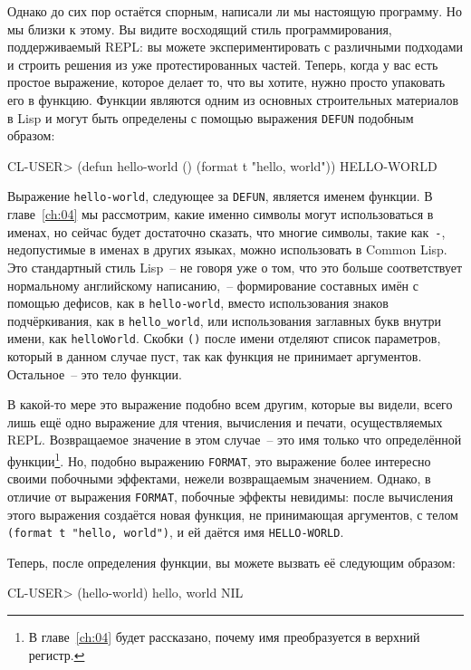 Однако до сих пор остаётся спорным, написали ли мы настоящую программу. Но мы близки к этому.
Вы видите восходящий стиль программирования, поддерживаемый REPL: вы можете
экспериментировать с различными подходами и строить решения из уже протестированных
частей. Теперь, когда у вас есть простое выражение, которое делает то, что вы хотите,
нужно просто упаковать его в функцию. Функции являются одним из основных строительных
материалов в Lisp и могут быть определены с помощью выражения \lstinline{DEFUN} подобным образом:

\begin{myverb}
CL-USER> (defun hello-world () (format t "hello, world"))
HELLO-WORLD
\end{myverb}

Выражение \lstinline{hello-world}, следующее за \lstinline{DEFUN}, является именем функции. В главе~\ref{ch:04} мы
рассмотрим, какие именно символы могут использоваться в именах, но сейчас будет достаточно
сказать, что многие символы, такие как~\lstinline|-|, недопустимые в именах в других
языках, можно использовать в Common Lisp. Это стандартный стиль Lisp~-- не говоря уже о том,
что это больше соответствует нормальному английскому написанию,~-- формирование составных имён с помощью дефисов,
как в \lstinline{hello-world}, вместо использования знаков подчёркивания, как в \lstinline|hello_world|, или
использования заглавных букв внутри имени, как \lstinline{helloWorld}. Скобки \lstinline{()} после имени отделяют
список параметров, который в данном случае пуст, так как функция не принимает
аргументов. Остальное~-- это тело функции.

В какой-то мере это выражение подобно всем другим, которые вы видели, всего лишь ещё одно
выражение для чтения, вычисления и печати, осуществляемых REPL. Возвращаемое значение в
этом случае~-- это имя только что определённой функции\footnote{В главе~\ref{ch:04} будет
  рассказано, почему имя преобразуется в верхний регистр.}. Но, подобно выражению
\lstinline{FORMAT}, это выражение более интересно своими побочными эффектами, нежели
возвращаемым значением. Однако, в отличие от выражения \lstinline{FORMAT}, побочные
эффекты невидимы: после вычисления этого выражения создаётся новая функция, не принимающая
аргументов, с телом \lstinline{(format t "hello, world")}, и ей даётся имя
\lstinline{HELLO-WORLD}.

Теперь, после определения функции, вы можете вызвать её следующим образом:

\begin{myverb}
CL-USER> (hello-world)
hello, world
NIL
\end{myverb}

